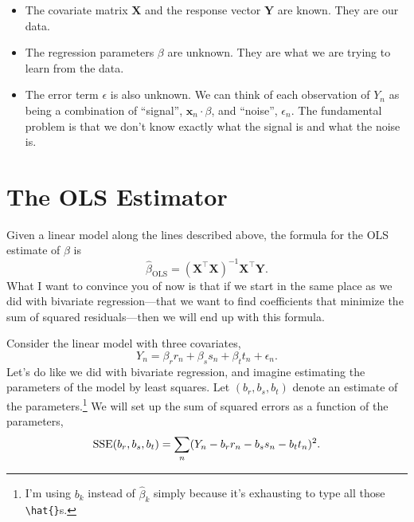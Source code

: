 \documentclass[
  12pt,
  oneside,openany]{book}
\begin{document}
\begin{itemize}
\item
  The covariate matrix \(\mathbf{X}\) and the response vector \(\mathbf{Y}\) are known. They are our data.
\item
  The regression parameters \(\beta\) are unknown. They are what we are trying to learn from the data.
\item
  The error term \(\epsilon\) is also unknown. We can think of each observation of \(Y_n\) as being a combination of ``signal'', \(\mathbf{x}_n \cdot \beta\), and ``noise'', \(\epsilon_n\). The fundamental problem is that we don't know exactly what the signal is and what the noise is.
\end{itemize}

\hypertarget{the-ols-estimator}{%
\section{The OLS Estimator}\label{the-ols-estimator}}

Given a linear model along the lines described above, the formula for the OLS estimate of \(\beta\) is \[\hat{\beta}_{\text{OLS}} = (\mathbf{X}^\top \mathbf{X})^{-1} \mathbf{X}^\top \mathbf{Y}.\]
What I want to convince you of now is that if we start in the same place as we did with bivariate regression---that we want to find coefficients that minimize the sum of squared residuals---then we will end up with this formula.

Consider the linear model with three covariates,
\[
Y_n = \beta_r r_n + \beta_s s_n + \beta_t t_n + \epsilon_n.
\]
Let's do like we did with bivariate regression, and imagine estimating the parameters of the model by least squares. Let \((b_r, b_s, b_t)\) denote an estimate of the parameters.\footnote{I'm using \(b_k\) instead of \(\hat{\beta}_k\) simply because it's exhausting to type all those \texttt{\textbackslash{}hat\{\}}s.} We will set up the sum of squared errors as a function of the parameters,
\[
\mathop{\rm SSE}\nolimits(b_r, b_s, b_t)
= \sum_n (Y_n - b_r r_n - b_s s_n - b_t t_n)^2.
\]
\end{document}
